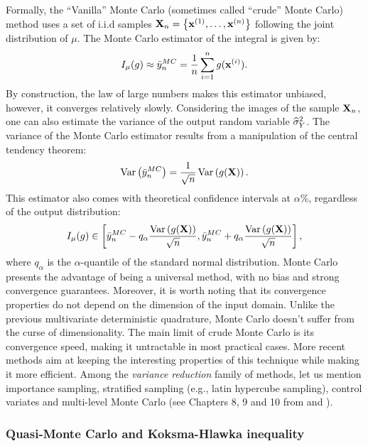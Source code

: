 Formally, the ``Vanilla'' Monte Carlo (sometimes called ``crude'' Monte Carlo) method uses a set of i.i.d samples ${\bf X}_n = \left\{{\bf x}^{(1)}, \dots, {\bf x}^{(n)}\right\}$ following the joint distribution of $\mu$. 
The Monte Carlo estimator of the integral is given by: 
\begin{equation}
    I_{\mu}(g) \approx \Bar{y}_n^{MC} = \frac1n \sum_{i=1}^{n} g({\bf x}^{(i)}).
\end{equation}
By construction, the law of large numbers makes this estimator unbiased, however, it converges relatively slowly. 
Considering the images of the sample ${\bf X}_n$, one can also estimate the variance of the output random variable $\widehat{\sigma}^2_Y$.
The variance of the Monte Carlo estimator results from a manipulation of the central tendency theorem:
\begin{equation}
    \operatorname{Var}\left(\Bar{y}_n^{MC}\right) = \frac{1}{\sqrt{n}} \operatorname{Var}\left(g({\bf X})\right). 
\end{equation}
This estimator also comes with theoretical confidence intervals at $\alpha \%$, regardless of the output distribution: 
\begin{equation}
    I_{\mu}(g) \in \left[\Bar{y}_n^{MC}  - q_\alpha \frac{\operatorname{Var}\left(g({\bf X})\right)}{\sqrt{n}}, \Bar{y}_n^{MC}  + q_\alpha \frac{\operatorname{Var}\left(g({\bf X})\right)}{\sqrt{n}} \right],
\end{equation}
where $q_\alpha$ is the $\alpha$-quantile of the standard normal distribution.
Monte Carlo presents the advantage of being a universal method, with no bias and strong convergence guarantees. 
Moreover, it is worth noting that its convergence properties do not depend on the dimension of the input domain. 
Unlike the previous multivariate deterministic quadrature, Monte Carlo doesn't suffer from the curse of dimensionality. 
The main limit of crude Monte Carlo is its convergence speed, making it untractable in most practical cases. 
More recent methods aim at keeping the interesting properties of this technique while making it more efficient.
Among the \textit{variance reduction} family of methods, let us mention importance sampling, stratified sampling (e.g., latin hypercube sampling), control variates and multi-level Monte Carlo (see Chapters 8, 9 and 10 from \citet{owen_2013} and \citep{giles_2008}).


\subsubsection{Quasi-Monte Carlo and Koksma-Hlawka inequality}


